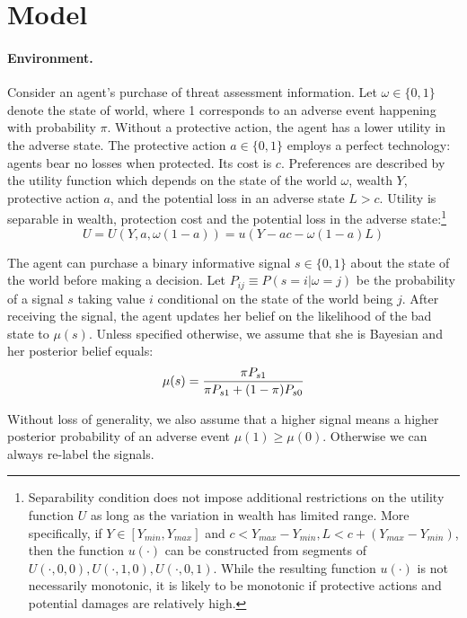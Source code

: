 \documentclass[12pt,a4paper]{article}
\begin{document}
\section{Model}
\paragraph{Environment.} Consider an agent's purchase of threat assessment information. Let $\omega \in \{0,1\}$ denote the state of world, where 1 corresponds to an adverse event happening with probability $\pi$. Without a protective action, the agent has a lower utility in the adverse state. The protective action $a\in\{0,1\}$ employs a perfect technology: agents bear no losses when protected. Its cost is $c$. Preferences are described by the utility function which depends on the state of the world $\omega$, wealth $Y$, protective action $a$, and the potential loss in an adverse state $L > c$. Utility is separable in wealth, protection cost and the potential loss in the adverse state:\footnote{Separability condition does not impose additional restrictions on the utility function $U$ as long as the variation in wealth has limited range. More specifically, if $Y \in [Y_{min},Y_{max}]$ and $c<Y_{max}-Y_{min}, L<c+(Y_{max}-Y_{min})$, then the function $u(\cdot)$ can be constructed from segments of $U(\cdot,0,0), U(\cdot,1,0), U(\cdot,0,1)$.  While the resulting function $u(\cdot)$ is not necessarily monotonic, it is likely to be monotonic if protective actions and potential damages are relatively high.}
\begin{equation}
U=U(Y,a,\omega(1-a))=u(Y-ac-\omega(1-a)L)
\end{equation}

The agent can purchase a binary informative signal $s\in\{0,1\}$ about the state of the world before making a decision. Let $P_{ij}\equiv P(s=i|\omega=j)$ be the probability of a signal $s$ taking value $i$ conditional on the state of the world being $j$.  After receiving the signal, the agent updates her belief on the likelihood of the bad state to $\mu(s)$. Unless specified otherwise, we assume that she is Bayesian and her posterior belief equals:
\begin{equation}
\mu(s)= {\pi P_{s1} \over \pi P_{s1}+(1-\pi)P_{s0}}
\end{equation}

Without loss of generality, we also assume that a higher signal means a higher posterior probability of an adverse event $\mu(1)\geq\mu(0)$. Otherwise we can always re-label the signals.
\end{document}
